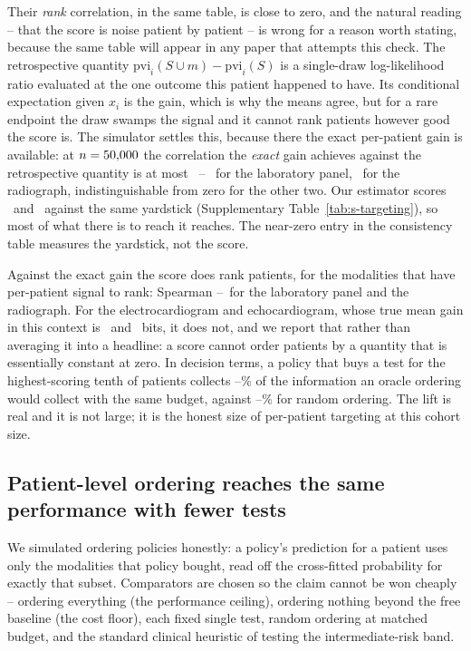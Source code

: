 \documentclass[11pt]{article}
\theoremstyle{definition}
\theoremstyle{remark}
\begin{document}
Their \emph{rank} correlation, in the same table, is close to zero, and the
natural reading -- that the score is noise patient by patient -- is wrong for a
reason worth stating, because the same table will appear in any paper that
attempts this check. The retrospective quantity
$\mathrm{pvi}_i(S\cup m)-\mathrm{pvi}_i(S)$ is a single-draw log-likelihood
ratio evaluated at the one outcome this patient happened to have. Its
conditional expectation given $x_i$ is the gain, which is why the means agree,
but for a rare endpoint the draw swamps the signal and it cannot rank patients
however good the score is. The simulator settles this, because there the exact
per-patient gain is available: at $n=50{,}000$ the correlation the \emph{exact}
gain achieves against the retrospective quantity is at most \tgtCeilingMax\ --
\tgtLabsCeiling\ for the laboratory panel, \tgtCxrCeiling\ for the radiograph,
indistinguishable from zero for the other two. Our estimator scores
\tgtLabsRhoRetro\ and \tgtCxrRhoRetro\ against the same yardstick
(Supplementary Table~\ref{tab:s-targeting}), so most of what there is to reach
it reaches. The near-zero entry in the consistency table measures the yardstick,
not the score.

Against the exact gain the score does rank patients, for the modalities that
have per-patient signal to rank: Spearman \tgtSignalRhoMin--\tgtSignalRhoMax\
for the laboratory panel and the radiograph. For the electrocardiogram and
echocardiogram, whose true mean gain in this context is \tgtEcgTrueBits\ and
\tgtEchoTrueBits\ bits, it does not, and we report that rather than averaging
it into a headline: a score cannot order patients by a quantity that is
essentially constant at zero. In decision terms, a policy that buys a test for
the highest-scoring tenth of patients collects
\tgtSignalCaptureMin--\tgtSignalCaptureMax\% of the information an oracle
ordering would collect with the same budget, against
\tgtSignalChanceMin--\tgtSignalChanceMax\% for random ordering. The lift is
real and it is not large; it is the honest size of per-patient targeting at this
cohort size.

\subsection{Patient-level ordering reaches the same performance with fewer tests}

We simulated ordering policies honestly: a policy's prediction for a patient uses
only the modalities that policy bought, read off the cross-fitted probability for
exactly that subset. Comparators are chosen so the claim cannot be won cheaply --
ordering everything (the performance ceiling), ordering nothing beyond the free
baseline (the cost floor), each fixed single test, random ordering at matched
budget, and the standard clinical heuristic of testing the intermediate-risk band.
\end{document}
